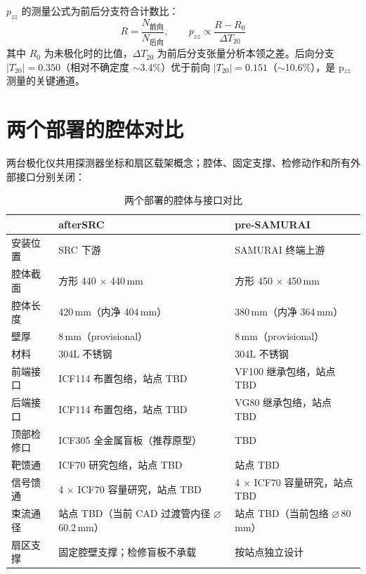 \documentclass[UTF8,10pt,letterpaper,fontset=none]{ctexart}
\begin{document}
$p_{zz}$ 的测量公式为前后分支符合计数比：
\[
R = \frac{N_\text{前向}}{N_\text{后向}}, \qquad
p_{zz} \propto \frac{R - R_0}{\Delta T_{20}}
\]
其中 $R_0$ 为未极化时的比值，$\Delta T_{20}$ 为前后分支张量分析本领之差。后向分支 $|T_{20}| = 0.350$（相对不确定度 $\sim$3.4\%）优于前向 $|T_{20}| = 0.151$（$\sim$10.6\%），是 p$_{zz}$ 测量的关键通道。

\section{两个部署的腔体对比}\label{sec:deploy}

两台极化仪共用探测器坐标和扇区载架概念；腔体、固定支撑、检修动作和所有外部接口分别关闭：

\begin{table}[h]
\centering
\sffamily\small
\caption{两个部署的腔体与接口对比}
\label{tab:deploy}
\renewcommand{\arraystretch}{1.3}
\begin{tabularx}{\textwidth}{l X X}
\toprule
 & \textbf{afterSRC} & \textbf{pre-SAMURAI} \\
\midrule
安装位置      & SRC 下游 & SAMURAI 终端上游 \\
腔体截面      & 方形 440 $\times$ 440\,mm & 方形 450 $\times$ 450\,mm \\
腔体长度      & 420\,mm（内净 404\,mm） & 380\,mm（内净 364\,mm） \\
壁厚          & 8\,mm（provisional） & 8\,mm（provisional） \\
材料          & 304L 不锈钢 & 304L 不锈钢 \\
前端接口      & ICF114 布置包络，站点 TBD & VF100 继承包络，站点 TBD \\
后端接口      & ICF114 布置包络，站点 TBD & VG80 继承包络，站点 TBD \\
顶部检修口    & ICF305 全金属盲板（推荐原型） & TBD \\
靶馈通        & ICF70 研究包络，站点 TBD & 站点 TBD \\
信号馈通      & 4 $\times$ ICF70 容量研究，站点 TBD & 4 $\times$ ICF70 容量研究，站点 TBD \\
束流通径      & 站点 TBD（当前 CAD 过渡管内径 \ensuremath{\varnothing}\,60.2\,mm） & 站点 TBD（当前包络 \ensuremath{\varnothing}\,80\,mm） \\
扇区支撑      & 固定腔壁支撑；检修盲板不承载 & 按站点独立设计 \\
\bottomrule
\end{tabularx}
\end{table}
\end{document}
